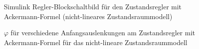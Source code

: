 \documentclass[
	pagesize,
	fontsize=12pt,
	paper=a4,
	oneside,
   reqno
]{scrartcl}
\begin{document}
\begin{figure}[H]
    \centering
    \caption[Ackermann Regler Simulink (nicht-linear)]{Simulink Regler-Blockschaltbild für den Zustandsregler mit Ackermann-Formel (nicht-lineares Zustandsraummodell)}
    \label{fig:Bild20.5}
\end{figure}

\begin{figure}[H]
    \centering
    \caption[$\varphi$ für Regler mit Ackermann-Formel (nicht-linear)]{$\varphi$ für verschiedene Anfangsauslenkungen am Zustandsregler mit Ackermann-Formel für das nicht-lineare Zustandsraummodell}
    \label{fig:Bild21}
\end{figure}
\end{document}
